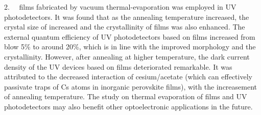 \begin{enabstract}
2.\ \  films fabricated by vacuum thermal-evaporation was employed in UV photodetectors. It was found that as the annealing temperature increased, the crystal size of  increased and the crystallinity of films was also enhanced. The external quantum efficiency of UV photodetectors based on  films increased from blow 5\% to around 20\%, which is in line with the improved morphology and the crystallinity. However, after annealing at higher temperature, the dark current density of the UV devices based on  films deteriorated remarkable. It was attributed to the decreased interaction of cesium/acetate (which can effectively passivate traps of Cs atoms in inorganic  perovskite films), with the increasement of annealing temperature. The study on thermal evaporation of  films and UV photodetectors may also benefit other optoelectronic applications in the future.

\end{enabstract}
\vspace{1em}\par\vfill



